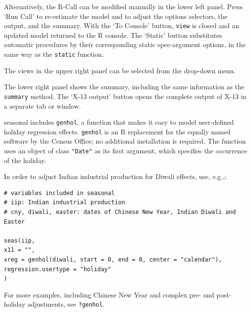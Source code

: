 Alternatively, the R-Call can be modified manually in the lower left
panel. Press `Run Call' to re-estimate the model and to adjust the
options selectors, the output, and the summary. With the `To Console'
button, \texttt{view} is closed and an updated model returned to the R
console. The `Static' button substitutes automatic procedures by their
corresponding static spec-argument options, in the same way as the
\texttt{static} function.

The views in the upper right panel can be selected from the drop-down
menu.

The lower right panel shows the summary, including the same information
as the \texttt{summary} method. The `X-13 output' button opens the
complete output of X-13 in a separate tab or window.


seasonal includes \texttt{genhol}, a function that makes it easy to
model user-defined holiday regression effects. \texttt{genhol} is an R
replacement for the equally named software by the Census Office; no
additional installation is required. The function uses an object of
class \texttt{"Date"} as its first argument, which specifies the
occurrence of the holiday.

In order to adjust Indian industrial production for Diwali effects, use,
e.g.,:

\begin{verbatim}
# variables included in seasonal
# iip: Indian industrial production
# cny, diwali, easter: dates of Chinese New Year, Indian Diwali and Easter

seas(iip, 
x11 = "",
xreg = genhol(diwali, start = 0, end = 0, center = "calendar"), 
regression.usertype = "holiday"
)
\end{verbatim}

For more examples, including Chinese New Year and complex pre- and
post-holiday adjustments, see \texttt{?genhol}.


